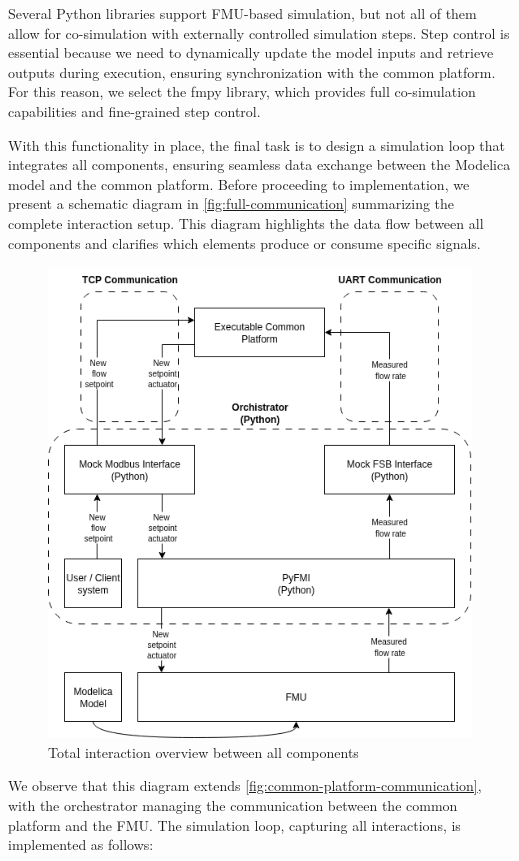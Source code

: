 \documentclass[we,final,11pt,oneside,openany]{uantwerpenbamathesis}
\begin{document}
Several Python libraries support FMU-based simulation, but not all of them allow for co-simulation with externally controlled simulation steps.
Step control is essential because we need to dynamically update the model inputs and retrieve outputs during execution, ensuring synchronization with the common platform.
For this reason, we select the fmpy library, which provides full co-simulation capabilities and fine-grained step control.

With this functionality in place, the final task is to design a simulation loop that integrates all components, ensuring seamless data exchange between the Modelica model and the common platform.
Before proceeding to implementation, we present a schematic diagram in \autoref{fig:full-communication} summarizing the complete interaction setup.
This diagram highlights the data flow between all components and clarifies which elements produce or consume specific signals.

\begin{figure}[h!]
    \centering
    \includegraphics[width=0.6\linewidth]{Images/generated/full-communication.drawio}
    \caption{Total interaction overview between all components}
    \label{fig:full-communication}
\end{figure}

We observe that this diagram extends \autoref{fig:common-platform-communication}, with the orchestrator managing the communication between the common platform and the FMU.
The simulation loop, capturing all interactions, is implemented as follows:
\end{document}
